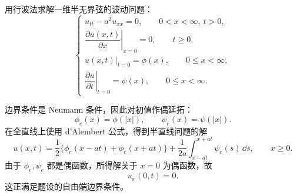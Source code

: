 \begin{question}
用行波法求解一维半无界弦的波动问题：
\[
\begin{cases}
u_{tt}-a^2u_{xx}=0,\qquad 0<x<\infty,\ t>0,\\
\left.\dfrac{\partial u(x,t)}{\partial x}\right|_{x=0}=0,\qquad t\ge0,\\
u(x,t)|_{t=0}=\phi(x),\qquad 0\le x<\infty,\\
\left.\dfrac{\partial u}{\partial t}\right|_{t=0}=\psi(x),\qquad 0\le x<\infty.
\end{cases}
\]
\begin{solution}
边界条件是 Neumann 条件，因此对初值作偶延拓：
\[
\phi_e(x)=\phi(|x|),\qquad \psi_e(x)=\psi(|x|).
\]
在全直线上使用 d'Alembert 公式，得到半直线问题的解
\[
u(x,t)=\frac12\{\phi_e(x-at)+\phi_e(x+at)\}
+\frac{1}{2a}\int_{x-at}^{x+at}\psi_e(s)\,\dd{s},
\qquad x\ge0.
\]
由于 \(\phi_e,\psi_e\) 都是偶函数，所得解关于 \(x=0\) 为偶函数，故
\[
u_x(0,t)=0.
\]
这正满足题设的自由端边界条件。
\end{solution}
\end{question}

